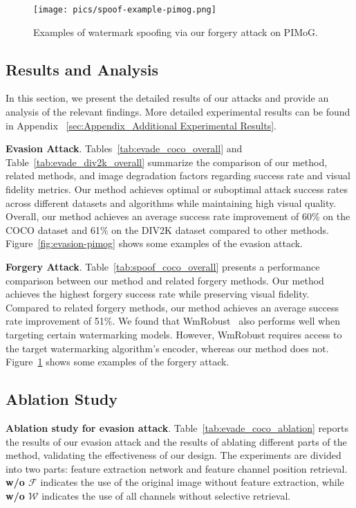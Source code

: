 \begin{figure}[!t]
    \centering
    \texttt{[image: pics/spoof-example-pimog.png]} 
    \vspace{-3mm}
    \caption{Examples of watermark spoofing via our forgery attack on PIMoG.}
    \label{fig:spoof-pimog}
    \vspace{-3mm}
\end{figure}

\subsection{Results and Analysis}
In this section, we present the detailed results of our attacks and provide an analysis of the relevant findings. More detailed experimental results can be found in Appendix ~\ref{sec:Appendix_Additional Experimental Results}.

\textbf{Evasion Attack}. Tables~\ref{tab:evade_coco_overall} and Table~\ref{tab:evade_div2k_overall} summarize the comparison of our method, related methods, and image degradation factors regarding success rate and visual fidelity metrics. Our method achieves optimal or suboptimal attack success rates across different datasets and algorithms while maintaining high visual quality. Overall, our method achieves an average success rate improvement of 60\% on the COCO dataset and 61\% on the DIV2K dataset compared to other methods. Figure~\ref{fig:evasion-pimog} shows some examples of the evasion attack.


\textbf{Forgery Attack}. Table~\ref{tab:spoof_coco_overall} presents a performance comparison between our method and related forgery methods. Our method achieves the highest forgery success rate while preserving visual fidelity. Compared to related forgery methods, our method achieves an average success rate improvement of 51\%. We found that WmRobust~\cite{saberi2023robustness} also performs well when targeting certain watermarking models. However, WmRobust requires access to the target watermarking algorithm's encoder, whereas our method does not. Figure~\ref{fig:spoof-pimog} shows some examples of the forgery attack.

\subsection{Ablation Study}
\textbf{Ablation study for evasion attack}. Table~\ref{tab:evade_coco_ablation} reports the results of our evasion attack and the results of ablating different parts of the method, validating the effectiveness of our design. The experiments are divided into two parts: feature extraction network and feature channel position retrieval. \textbf{w/o $\mathcal{F}$} indicates the use of the original image without feature extraction, while \textbf{w/o $\mathcal{W}$} indicates the use of all channels without selective retrieval. 

